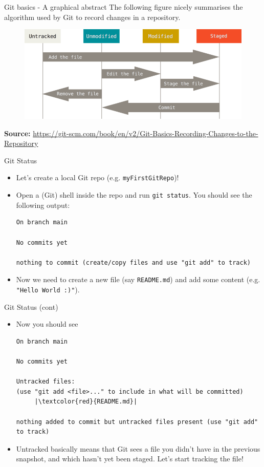 \documentclass[
hyperref={bookmarks=false},
xcolor={dvipsnames,svgnames*,x11names*}, 
12pt
]{beamer}
\begin{document}
\begin{frame}{Git basics - A graphical abstract}
	\vspace{-0.5cm}
	The following figure nicely summarises the algorithm used by Git to record changes in a repository. 
	\begin{figure}
		\centering
		\includegraphics[width=\linewidth]{figures/lifecycle.png}
	\end{figure}
	\textbf{Source:} \url{https://git-scm.com/book/en/v2/Git-Basics-Recording-Changes-to-the-Repository}
\end{frame}

\begin{frame}[fragile]{Git Status}
\vspace{-0.5cm}
\begin{itemize}
\itemsep 2ex
\item Let's create a local Git repo (e.g. \texttt{myFirstGitRepo})!
\item Open a (Git) shell inside the repo and run \texttt{git status}. You should see the following output: 

\begin{lstlisting}
On branch main

No commits yet

nothing to commit (create/copy files and use "git add" to track)
\end{lstlisting}

\item Now we need to create a new file (say \texttt{README.md}) and add some content (e.g. \texttt{"Hello World :)"}). 
\end{itemize}
\end{frame}

\begin{frame}[fragile]{Git Status (cont)}
\vspace{-0.5cm}
\begin{itemize}
\itemsep 2ex
\item Now you should see 
\begin{lstlisting}
On branch main
	
No commits yet
	
Untracked files:
(use "git add <file>..." to include in what will be committed)
     |\textcolor{red}{README.md}|
	
nothing added to commit but untracked files present (use "git add" to track)
\end{lstlisting}
\item Untracked basically means that Git sees a file you didn’t have in the previous snapshot, and which hasn’t yet been staged. Let's start tracking the file!
\end{itemize}
\end{frame}
\end{document}
